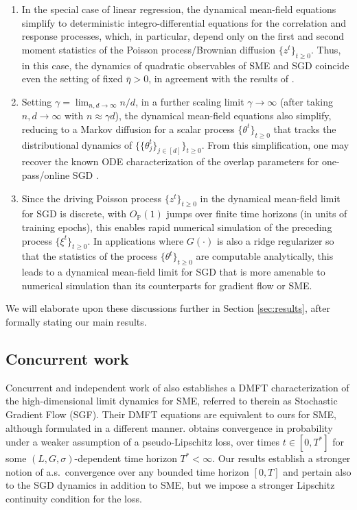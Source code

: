 \documentclass[11pt,letterpaper,reqno]{amsart}
\theoremstyle{definition}
\def\P{\mathbb{P}}
\begin{document}
\begin{enumerate}[1.]
\item In the special case of linear regression, the
dynamical mean-field equations simplify to deterministic integro-differential
equations for the correlation and response processes, which, in particular,
depend only on the first and second moment statistics of the Poisson
process/Brownian diffusion $\{z^t\}_{t \geq 0}$. Thus, in this case, the
dynamics of quadratic observables of SME and SGD coincide even the setting of
fixed $\bar\eta>0$, in agreement with the results of
\cite{paquette2025homogenization}.\\

\item Setting $\gamma=\lim_{n,d \to \infty} n/d$, in a further scaling limit $\gamma \to \infty$ (after taking $n,d \to \infty$ with $n \approx \gamma d$), the dynamical mean-field equations also simplify,
reducing to a Markov diffusion for a scalar process $\{\theta^t\}_{t \geq
0}$ that tracks the distributional dynamics of $\{\{\theta_j^t\}_{j \in [d]}\}_{t
\geq 0}$. From this simplification, one may recover the known ODE
characterization of the overlap parameters
for one-pass/online SGD \cite{saad1995dynamics,goldt2019dynamics}.\\

\item Since the driving Poisson process $\{z^t\}_{t \geq 0}$ in the
dynamical mean-field limit for SGD is discrete, with $O_\P(1)$ jumps over finite
time horizons (in units of training epochs), this enables rapid numerical simulation of
the preceding process $\{\xi^t\}_{t \geq 0}$. In applications
where $G(\cdot)$ is also a ridge regularizer so that the statistics of the
process $\{\theta^t\}_{t \geq 0}$ are computable analytically, this leads to a
dynamical mean-field limit for SGD that is more amenable to numerical simulation than its
counterparts for gradient flow or SME.\\
\end{enumerate}

We will elaborate upon these discussions further in Section \ref{sec:results},
after formally stating our main results.

\subsection*{Concurrent work}
Concurrent and independent work of \cite{nishiyama2026high} also establishes a DMFT characterization of the high-dimensional limit dynamics for SME, referred to therein as Stochastic Gradient Flow (SGF). Their DMFT equations are equivalent to ours for SME, although formulated in a different manner. \cite{nishiyama2026high} obtains convergence in probability under a weaker assumption of a pseudo-Lipschitz loss, over times $t \in [0,T^*]$ for some $(L,G,\sigma)$-dependent time horizon $T^*<\infty$. Our results establish a stronger notion of a.s.\ convergence over any bounded time horizon $[0,T]$ and pertain also to the SGD dynamics in addition to SME, but we impose a stronger Lipschitz continuity condition for the loss.
\end{document}

